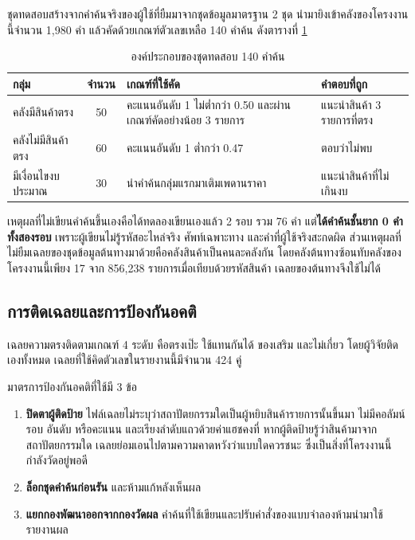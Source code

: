 ชุดทดสอบสร้างจากคำค้นจริงของผู้ใช้ที่ยืมมาจากชุดข้อมูลมาตรฐาน 2 ชุด \cite{reddy2022esci, chen2022wands} นำมายิงเข้าคลังของโครงงานนี้จำนวน 1{,}980 คำ แล้วคัดด้วยเกณฑ์ตัวเลขเหลือ 140 คำค้น ดังตารางที่ \ref{tab:testset}

\begin{table}[H]
\centering
\caption{องค์ประกอบของชุดทดสอบ 140 คำค้น}
\label{tab:testset}
\small
\begin{tabular}{|l|c|p{4.3cm}|p{3.1cm}|}
\hline
\textbf{กลุ่ม} & \textbf{จำนวน} & \textbf{เกณฑ์ที่ใช้คัด} & \textbf{คำตอบที่ถูก} \\
\hline
คลังมีสินค้าตรง & 50 & คะแนนอันดับ 1 ไม่ต่ำกว่า 0.50 และผ่านเกณฑ์คัดอย่างน้อย 3 รายการ & แนะนำสินค้า 3 รายการที่ตรง \\ \hline
คลังไม่มีสินค้าตรง & 60 & คะแนนอันดับ 1 ต่ำกว่า 0.47 & ตอบว่าไม่พบ \\ \hline
มีเงื่อนไขงบประมาณ & 30 & นำคำค้นกลุ่มแรกมาเติมเพดานราคา & แนะนำสินค้าที่ไม่เกินงบ \\
\hline
\end{tabular}
\end{table}

เหตุผลที่ไม่เขียนคำค้นขึ้นเองคือได้ทดลองเขียนเองแล้ว 2 รอบ รวม 76 คำ แต่\textbf{ได้คำค้นชั้นยาก 0 คำทั้งสองรอบ} เพราะผู้เขียนไม่รู้รหัสอะไหล่จริง ศัพท์เฉพาะทาง และคำที่ผู้ใช้จริงสะกดผิด ส่วนเหตุผลที่ไม่ยืมเฉลยของชุดข้อมูลต้นทางมาด้วยคือคลังสินค้าเป็นคนละคลังกัน โดยคลังต้นทางซ้อนทับคลังของโครงงานนี้เพียง 17 จาก 856{,}238 รายการเมื่อเทียบด้วยรหัสสินค้า เฉลยของต้นทางจึงใช้ไม่ได้

\subsection{การติดเฉลยและการป้องกันอคติ}

เฉลยความตรงติดตามเกณฑ์ 4 ระดับ \cite{reddy2022esci} คือตรงเป๊ะ ใช้แทนกันได้ ของเสริม และไม่เกี่ยว โดยผู้วิจัยติดเองทั้งหมด เฉลยที่ใช้คิดตัวเลขในรายงานนี้มีจำนวน 424 คู่

มาตรการป้องกันอคติที่ใช้มี 3 ข้อ

\begin{enumerate}[label=\arabic*)]
    \item \textbf{ปิดตาผู้ติดป้าย} ไฟล์เฉลยไม่ระบุว่าสถาปัตยกรรมใดเป็นผู้หยิบสินค้ารายการนั้นขึ้นมา ไม่มีคอลัมน์รอบ อันดับ หรือคะแนน และเรียงลำดับแถวด้วยค่าแฮชคงที่ หากผู้ติดป้ายรู้ว่าสินค้ามาจากสถาปัตยกรรมใด เฉลยย่อมเอนไปตามความคาดหวังว่าแบบใดควรชนะ ซึ่งเป็นสิ่งที่โครงงานนี้กำลังวัดอยู่พอดี
    \item \textbf{ล็อกชุดคำค้นก่อนรัน} และห้ามแก้หลังเห็นผล
    \item \textbf{แยกกองพัฒนาออกจากกองวัดผล} คำค้นที่ใช้เขียนและปรับคำสั่งของแบบจำลองห้ามนำมาใช้รายงานผล
\end{enumerate}

